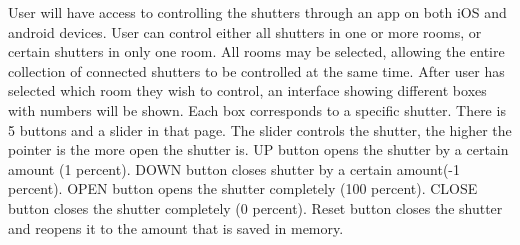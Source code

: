 User will have access to controlling the shutters through an app on both iOS and android devices. User can control either all shutters in one or more rooms, or certain shutters in only one room. All rooms may be selected, allowing the entire collection of connected shutters to be controlled at the same time. After user has selected which room they wish to control, an interface showing different boxes with numbers will be shown. Each box corresponds to a specific shutter. There is 5 buttons and a slider in that page. The slider controls the shutter, the higher the pointer is the more open the shutter is. UP button opens the shutter by a certain amount (1 percent). DOWN button closes shutter by a certain amount(-1 percent). OPEN button opens the shutter completely (100 percent). CLOSE button closes the shutter completely (0 percent). Reset button closes the shutter and reopens it to the amount that is saved in memory. 

